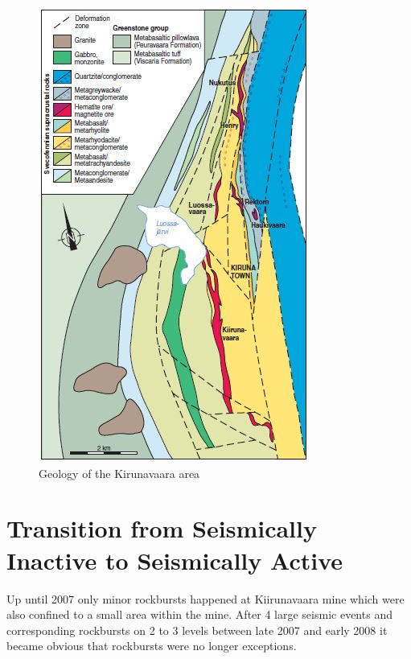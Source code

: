 \begin{figure}
\centering
\includegraphics[height = 0.5\textheight]{pics/geo.jpg}
\caption{Geology of the Kirunavaara area \autocite{KirunaGeo}}
\label{fig:geo}
\end{figure}

\section{Transition from Seismically Inactive to Seismically Active}

Up until 2007 only minor rockbursts happened at Kiirunavaara mine which were also confined to a small area within the mine. After 4 large seismic events and corresponding rockbursts on 2 to 3 levels between late 2007 and early 2008 it became obvious that rockbursts were no longer exceptions. %

